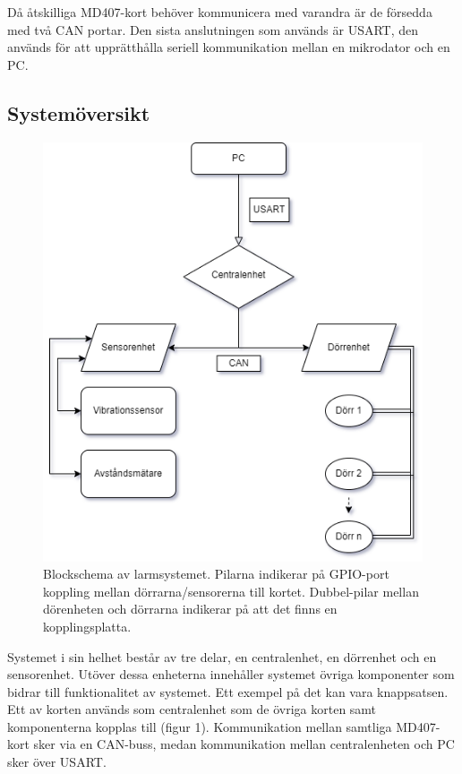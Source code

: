 \documentclass{article}
\begin{document}
Då åtskilliga MD407-kort behöver kommunicera med varandra är de försedda med två CAN portar. Den sista anslutningen som används är USART, den används för att upprätthålla seriell kommunikation mellan en mikrodator och en PC.

\newpage
\subsection{Systemöversikt}
\begin{figure}[h]
    \centering
    \includegraphics[scale=0.6]{Projektrapport/diagram.png}
    \caption {Blockschema av larmsystemet. Pilarna indikerar på GPIO-port koppling mellan dörrarna/sensorerna till kortet. Dubbel-pilar mellan dörenheten och dörrarna indikerar på att det finns en kopplingsplatta.}
    \label{fig:drawing}
\end{figure}

Systemet i sin helhet består av tre delar, en centralenhet, en dörrenhet och en sensorenhet. 
Utöver dessa enheterna innehåller systemet övriga komponenter som bidrar till funktionalitet av systemet. 
Ett exempel på det kan vara knappsatsen.
Ett av korten används som centralenhet som de övriga korten samt komponenterna kopplas till (figur 1).
Kommunikation mellan samtliga MD407-kort sker via en CAN-buss, medan kommunikation mellan centralenheten och PC sker över USART.
\end{document}
